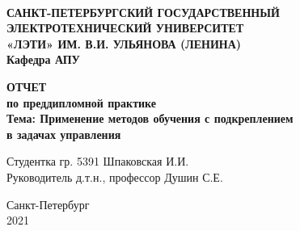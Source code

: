 \thispagestyle{empty}%
\makeatletter
{}
%
\makeatother

\normalsize{}
\begin{center}{
\hfill {}\\
{\textbf{САНКТ-ПЕТЕРБУРГСКИЙ ГОСУДАРСТВЕННЫЙ}}\\
{\textbf{ЭЛЕКТРОТЕХНИЧЕСКИЙ УНИВЕРСИТЕТ}}\\
{\textbf{«ЛЭТИ» ИМ. В.И. УЛЬЯНОВА (ЛЕНИНА)}}\\
{\textbf{Кафедра АПУ}}\\
\hfill \break



\normalsize{}
\vspace{5cm}
\textbf{ОТЧЕТ}\\
\textbf{по преддипломной практике}\\
\textbf{Тема: Применение методов обучения с подкреплением}\\
\textbf{ в задачах управления}\\
\vspace{6cm}
 
\begin{flushleft}
 \hspace{1cm} Студентка \hspace{1,7cm} гр. 5391 \hspace{2cm} \underline{\hspace{3cm}} \hspace{0,2cm} Шпаковская И.И. \\ 
 \vspace{5mm}
 \hspace{1cm} Руководитель \hspace{1cm} д.т.н., профессор \hspace{0,2cm} \underline{\hspace{3cm}} \hspace{0,2cm}  Душин С.Е.\\ 

\end{flushleft}

\vspace{1cm}
Санкт-Петербург \\ 2021 
}\end{center}
\thispagestyle{empty} %
 


\vspace{0pt plus4fill}%



\restoregeometry
\newpage